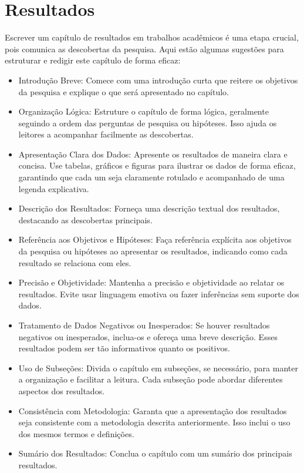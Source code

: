 
\chapter{Resultados}\label{chap:resultados}
	
	Escrever um capítulo de resultados em trabalhos acadêmicos é uma etapa crucial, pois comunica as descobertas da pesquisa. Aqui estão algumas sugestões para estruturar e redigir este capítulo de forma eficaz:

	\begin{itemize}
		\item Introdução Breve: Comece com uma introdução curta que reitere os objetivos da pesquisa e explique o que será apresentado no capítulo.
		
		\item Organização Lógica: Estruture o capítulo de forma lógica, geralmente seguindo a ordem das perguntas de pesquisa ou hipóteses. Isso ajuda os leitores a acompanhar facilmente as descobertas.
		
		\item Apresentação Clara dos Dados: Apresente os resultados de maneira clara e concisa. Use tabelas, gráficos e figuras para ilustrar os dados de forma eficaz, garantindo que cada um seja claramente rotulado e acompanhado de uma legenda explicativa.
		
		\item Descrição dos Resultados: Forneça uma descrição textual dos resultados, destacando as descobertas principais. 
		
		\item Referência aos Objetivos e Hipóteses: Faça referência explícita aos objetivos da pesquisa ou hipóteses ao apresentar os resultados, indicando como cada resultado se relaciona com eles.
		
		\item Precisão e Objetividade: Mantenha a precisão e objetividade ao relatar os resultados. Evite usar linguagem emotiva ou fazer inferências sem suporte dos dados.
		
		\item Tratamento de Dados Negativos ou Inesperados: Se houver resultados negativos ou inesperados, inclua-os e ofereça uma breve descrição. Esses resultados podem ser tão informativos quanto os positivos.
		
		\item Uso de Subseções: Divida o capítulo em subseções, se necessário, para manter a organização e facilitar a leitura. Cada subseção pode abordar diferentes aspectos dos resultados.
		
		\item Consistência com Metodologia: Garanta que a apresentação dos resultados seja consistente com a metodologia descrita anteriormente. Isso inclui o uso dos mesmos termos e definições.
		
		\item Sumário dos Resultados: Conclua o capítulo com um sumário dos principais resultados.
	\end{itemize}